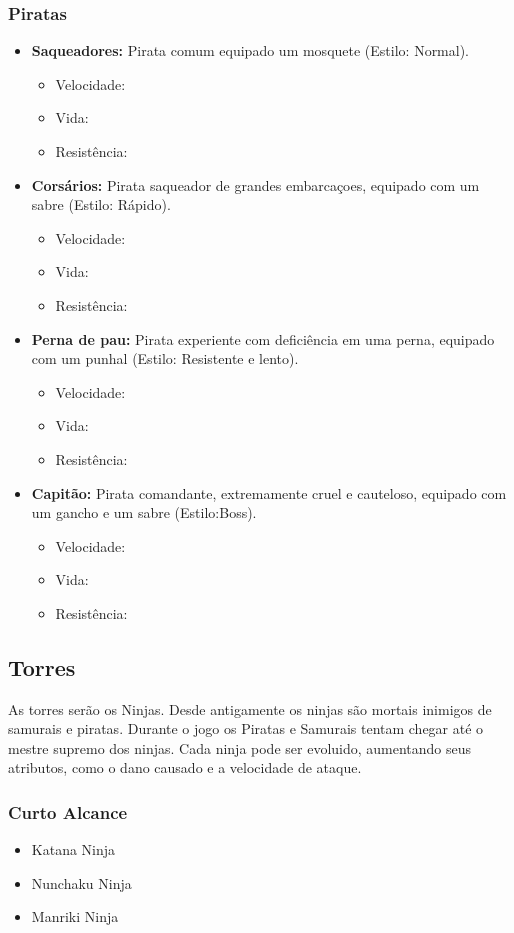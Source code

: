 \documentclass[10pt,a4paper]{article}
\begin{document}
\subsubsection{Piratas}
\begin{itemize}
\item \textbf{Saqueadores:} Pirata comum equipado um mosquete (Estilo: Normal).
	\begin{itemize}
	\item Velocidade:
	\item Vida:
	\item Resistência:
	\end{itemize}
\item \textbf{Corsários:} Pirata saqueador de grandes embarcaçoes, equipado com um sabre (Estilo: Rápido).
	\begin{itemize}
	\item Velocidade:
	\item Vida:
	\item Resistência:
	\end{itemize}
\item \textbf{Perna de pau:} Pirata experiente com deficiência em uma perna, equipado com um punhal (Estilo: Resistente e lento).
	\begin{itemize}
	\item Velocidade:
	\item Vida:
	\item Resistência:
	\end{itemize}
\item \textbf{Capitão:} Pirata comandante, extremamente cruel e cauteloso, equipado com um gancho e um sabre (Estilo:Boss).
	\begin{itemize}
	\item Velocidade:
	\item Vida:
	\item Resistência:
	\end{itemize}
\end{itemize}

\subsection{Torres}
	As torres serão os Ninjas. Desde antigamente os ninjas são mortais inimigos de samurais e
piratas. Durante o jogo os Piratas e Samurais tentam chegar até o mestre supremo dos ninjas. Cada
ninja pode ser evoluido, aumentando seus atributos, como o dano causado e a velocidade de ataque.\\
\subsubsection{Curto Alcance}
\begin{itemize}
\item Katana Ninja
\item Nunchaku Ninja
\item Manriki Ninja
\end{itemize}
\end{document}
